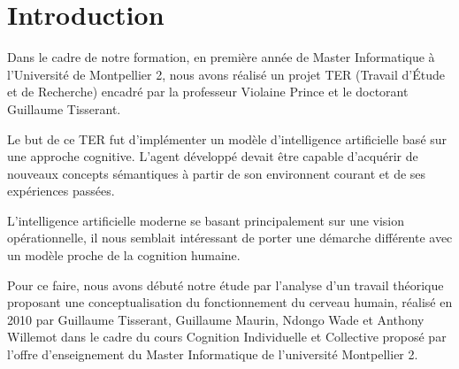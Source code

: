 \chapter*{Introduction}
Dans le cadre de notre formation, en première année de Master Informatique à l'Université de Montpellier 2, nous avons réalisé un projet TER (Travail d'Étude et de Recherche) encadré par la professeur \mbox{Violaine} \mbox{Prince} et le doctorant \mbox{Guillaume} \mbox{Tisserant}.

Le but de ce TER fut d'implémenter un modèle d'intelligence artificielle basé sur une approche cognitive. L'agent développé devait être capable d'acquérir de nouveaux concepts sémantiques à partir de son environnent courant et de ses expériences passées.

L'intelligence artificielle moderne se basant principalement sur une vision opérationnelle, il nous semblait intéressant de porter une démarche différente avec un modèle proche de la cognition humaine.

Pour ce faire, nous avons débuté notre étude par l'analyse d'un travail théorique proposant une conceptualisation du fonctionnement du cerveau humain, réalisé en 2010 par \mbox{Guillaume} \mbox{Tisserant}, \mbox{Guillaume} \mbox{Maurin}, \mbox{Ndongo} \mbox{Wade} et \mbox{Anthony} \mbox{Willemot} dans le cadre du cours \og Cognition Individuelle et Collective\fg{} proposé par l'offre d'enseignement du Master Informatique de l'université Montpellier 2.
